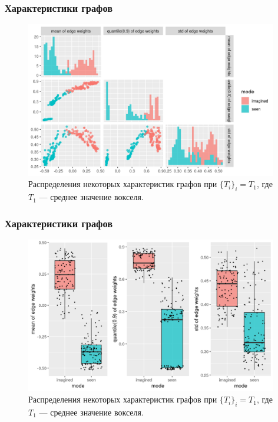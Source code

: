 \documentclass{beamer}
\begin{document}
	\begin{frame} 
		\frametitle{Характеристики графов}
		\vspace{-0.75cm}
		\begin{figure}
			\includegraphics[width=11cm]{../images/graph_feachers_1.png}
			\caption{Распределения некоторых характеристик графов при $\{T_i\}_i = T_1$, где $T_1$ --- среднее значение вокселя.} 
			\label{fg:13}
		\end{figure}
	\end{frame}

	\begin{frame} 
		\frametitle{Характеристики графов}
		\vspace{-0.75cm}
		\begin{figure}
			\includegraphics[width=11cm]{../images/graph_feachers_2.png}
			\caption{Распределения некоторых характеристик графов при $\{T_i\}_i = T_1$, где $T_1$ --- среднее значение вокселя.} 
			\label{fg:13}
		\end{figure}
	\end{frame}
	
\end{document}

